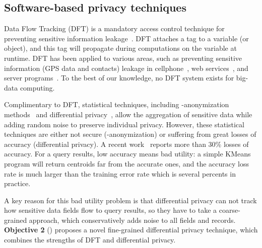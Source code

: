 \vspace{-.15in}\subsection{Software-based privacy techniques}
\label{sec:dft}\vspace{-.075in}

Data Flow Tracking (DFT) is a mandatory access control technique for preventing 
sensitive information leakage~\cite{dawn05:taint}. DFT attaches a tag to a 
variable (or object), and this tag will propagate during computations on the 
variable at runtime. DFT has been applied to various areas, such as preventing 
sensitive information (\eg GPS data and contacts) leakage in 
cellphone~\cite{taintdroid:osdi10,cleanos:osdi12}, web 
services~\cite{cloudfence:raid13}, and server programs~\cite{libdft:vee12}. To 
the best of our knowledge, no DFT system exists for big-data computing.
 
 


Complimentary to DFT, statistical techniques, including -anonymization 
methods~\cite{kanonymity,icde06:ldiversity} and
differential privacy~\cite{gupt:sigmod12, pinq:sigmod09,airavat:nsdi10}, allow 
the aggregation of sensitive data while adding random noise to preserve 
individual privacy. However, these statistical techniques are either not secure 
(-anonymization) or suffering from great losses of accuracy 
(differential privacy). A recent work~\cite{differentialresult:vldb15} reports 
more than 30\% losses of accuracy. For a query results, low accuracy means 
bad utility: a simple KMeans program will return centroids far from the 
accurate ones, and the accuracy loss rate is much larger than the training error 
rate which is several percents in practice.

A key reason for this bad utility problem is that differential privacy can not 
track how sensitive data fields flow to query results, so they have to take a 
coarse-grained approach, which conservatively adds noise to all fields and 
records. \textbf{Objective 2} () proposes a novel fine-grained 
differential privacy technique, which combines  the strengths of DFT and 
differential privacy.



